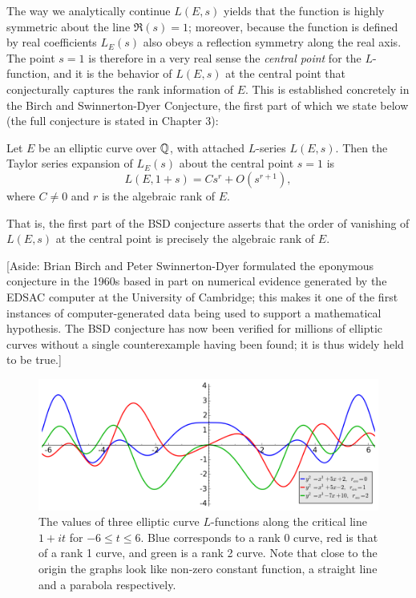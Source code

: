 \documentclass[10pt]{article}
\begin{document}
The way we analytically continue $L(E,s)$ yields that the function is highly symmetric about the line $\Re(s)=1$; moreover, because the function is defined by real coefficients $L_E(s)$ also obeys a reflection symmetry along the real axis. The point $s=1$ is therefore in a very real sense the {\it central point} for the $L$-function, and it is the behavior of $L(E,s)$ at the central point that conjecturally captures the rank information of $E$. This is established concretely in the Birch and Swinnerton-Dyer Conjecture, the first part of which we state below (the full conjecture is stated in Chapter 3):

\begin{conjecture}
Let $E$ be an elliptic curve over $\mathbb{Q}$, with attached $L$-series $L(E,s)$. Then the Taylor series expansion of $L_E(s)$ about the central point $s=1$ is
\begin{equation}
L(E,1+s) = Cs^r  + O(s^{r+1}),
\end{equation}
where
$C \ne 0$ and $r$ is the algebraic rank of $E$.
\end{conjecture}
That is, the first part of the BSD conjecture asserts that the order of vanishing of $L(E,s)$ at the central point is precisely the algebraic rank of $E$.

[Aside: Brian Birch and Peter Swinnerton-Dyer formulated the eponymous conjecture in the 1960s based in part on numerical evidence generated by the EDSAC computer at the University of Cambridge; this makes it one of the first instances of computer-generated data being used to support a mathematical hypothesis. The BSD conjecture has now been verified for millions of elliptic curves without a single counterexample having been found; it is thus widely held to be true.]

\begin{figure}[!h]
    \centering
    \includegraphics[width=1.0\textwidth]{graphics/L-functions_at_origin.png}
    \caption{The values of three elliptic curve $L$-functions along the critical line $1+it$ for $-6 \le t \le 6$. Blue corresponds to a rank 0 curve, red is that of a rank 1 curve, and green is a rank 2 curve. Note that close to the origin the graphs look like non-zero constant function, a straight line and a parabola respectively.}
    \label{fig:L-functions_at_origin}
\end{figure}
\end{document}
